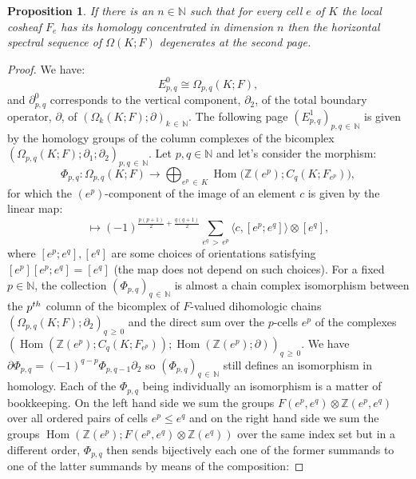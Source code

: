 \documentclass[10pt]{amsart}
\newtheorem{prop}[theo]{Proposition}
\theoremstyle{definition}
\numberwithin{equation}{section}
\numberwithin{figure}{section}
\newcommand{\Z}{\mathbb{Z}}
\newcommand{\N}{\mathbb{N}}
\DeclareMathOperator{\Hom}{Hom}
\begin{document}
\begin{prop}\label{prp:degenerate_E2_lef}
If there is an $n\in\N$ such that for every cell $e$ of $K$ the local cosheaf $F_e$ has its homology concentrated in dimension $n$ then the horizontal spectral sequence of $\Omega(K;F)$ degenerates at the second page.
\end{prop}

\begin{proof}
We have:
\begin{equation*}
E^0_{p,q}\cong \Omega_{p,q}(K;F),
\end{equation*}
and $\partial^0_{p,q}$ corresponds to the vertical component, $\partial_2$, of the total boundary operator, $\partial$, of $(\Omega_{k}(K;F);\partial)_{k\,\in\,\N}$. The following page $(E^1_{p,q})_{p,q\,\in\,\N}$ is given by the homology groups of the column complexes of the bicomplex $(\Omega_{p,q}(K;F);\partial_1;\partial_2)_{p,q\,\in\,\N}$. Let $p,q\in\N$ and let's consider the morphism:
\begin{equation*}
\Phi_{p,q} : \Omega_{p,q}(K;F) \rightarrow \bigoplus_{e^p\,\in\,K}\Hom\big(\Z(e^p);C_q(K;F_{e^p})\big),
\end{equation*}
for which the $(e^p)$-component of the image of an element $c$ is given by the linear map:
\begin{equation*}
[e^p]\mapsto (-1)^{\frac{p(p+1)}{2}+\frac{q(q+1)}{2}}\sum_{e^q\,>\,e^p}\langle c,[e^p;e^q]\rangle\otimes[e^q],
\end{equation*}
where $[e^p;e^q],[e^q]$ are some choices of orientations satisfying $[e^p][e^p;e^q]=[e^q]$ (the map does not depend on such choices). For a fixed $p\in\N$, the collection $(\Phi_{p,q})_{q\,\in\,\N}$ is almost a chain complex isomorphism between the $p^{\rm th}$ column of the bicomplex of $F$-valued dihomologic chains $(\Omega_{p,q}(K;F);\partial_2)_{q\,\geq\,0}$ and the direct sum over the $p$-cells $e^p$ of the complexes $(\Hom(\Z(e^p);C_q(K;F_{e^p}));\Hom(\Z(e^p);\partial))_{q\,\geq\,0}$. We have $\partial\Phi_{p,q}=(-1)^{q-p}\Phi_{p,q-1}\partial_2$ so $(\Phi_{p,q})_{q\,\in\,\N}$ still defines an isomorphism in homology. Each of the $\Phi_{p,q}$ being individually an isomorphism is a matter of bookkeeping. On the left hand side we sum the groups $F(e^p,e^q)\otimes \Z(e^p,e^q)$ over all ordered pairs of cells $e^p\leq e^q$ and on the right hand side we sum the groups $\Hom(\Z(e^p);F(e^p,e^q)\otimes\Z(e^q))$ over the same index set but in a different order, $\Phi_{p,q}$ then sends bijectively each one of the former summands to one of the latter summands by means of the composition:

\end{proof}
\end{document}
